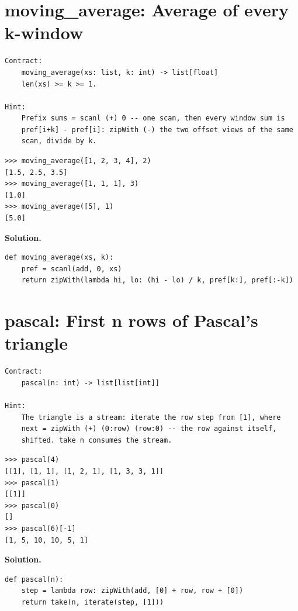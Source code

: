 \documentclass[10pt,letterpaper]{book}
\begin{document}
\section{moving\_average: Average of every k-window}
\begin{lstlisting}[style=ex]
Contract:
    moving_average(xs: list, k: int) -> list[float]
    len(xs) >= k >= 1.

Hint:
    Prefix sums = scanl (+) 0 -- one scan, then every window sum is
    pref[i+k] - pref[i]: zipWith (-) the two offset views of the same
    scan, divide by k.
\end{lstlisting}
\begin{lstlisting}[style=ex]
>>> moving_average([1, 2, 3, 4], 2)
[1.5, 2.5, 3.5]
>>> moving_average([1, 1, 1], 3)
[1.0]
>>> moving_average([5], 1)
[5.0]
\end{lstlisting}
\noindent\textbf{Solution.}
\begin{lstlisting}[style=code]
def moving_average(xs, k):
    pref = scanl(add, 0, xs)
    return zipWith(lambda hi, lo: (hi - lo) / k, pref[k:], pref[:-k])
\end{lstlisting}

\section{pascal: First n rows of Pascal's triangle}
\begin{lstlisting}[style=ex]
Contract:
    pascal(n: int) -> list[list[int]]

Hint:
    The triangle is a stream: iterate the row step from [1], where
    next = zipWith (+) (0:row) (row:0) -- the row against itself,
    shifted. take n consumes the stream.
\end{lstlisting}
\begin{lstlisting}[style=ex]
>>> pascal(4)
[[1], [1, 1], [1, 2, 1], [1, 3, 3, 1]]
>>> pascal(1)
[[1]]
>>> pascal(0)
[]
>>> pascal(6)[-1]
[1, 5, 10, 10, 5, 1]
\end{lstlisting}
\noindent\textbf{Solution.}
\begin{lstlisting}[style=code]
def pascal(n):
    step = lambda row: zipWith(add, [0] + row, row + [0])
    return take(n, iterate(step, [1]))
\end{lstlisting}
\end{document}
